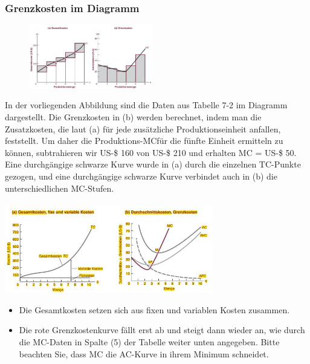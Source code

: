 \documentclass[10pt]{scrartcl}
\begin{document}
\subsubsection{Grenzkosten im Diagramm}
\begin{figure}
\vspace{-20pt}
  \begin{center}
    \includegraphics[width=0.48\textwidth]{img/grenzkosten_diagramm.jpg}
  \end{center}
  \vspace{-10pt}
\end{figure}
In der vorliegenden Abbildung sind die Daten aus Tabelle 7-2 im Diagramm dargestellt. Die Grenzkosten in (b) werden berechnet, indem man die Zusatzkosten, die laut (a) für jede zusätzliche Produktionseinheit anfallen, feststellt. Um daher die Produktions-MCfür die fünfte Einheit ermitteln zu können, subtrahieren wir US-\$ 160 von US-\$ 210 und erhalten MC = US-\$ 50. Eine durchgängige schwarze Kurve wurde in (a) durch die einzelnen TC-Punkte gezogen, und eine durchgängige schwarze Kurve verbindet auch in (b) die unterschiedlichen MC-Stufen.\\ \\
\includegraphics[width=0.68\textwidth]{img/gesamtkosten.jpg}
\begin{itemize}
\item Die Gesamtkosten setzen sich aus fixen und variablen Kosten zusammen.
\item Die rote Grenzkostenkurve fällt erst ab und steigt dann wieder an, wie durch die MC-Daten in Spalte (5) der Tabelle weiter unten angegeben. Bitte beachten Sie, dass MC die AC-Kurve in ihrem Minimum schneidet.
\end{itemize}
\end{document}
